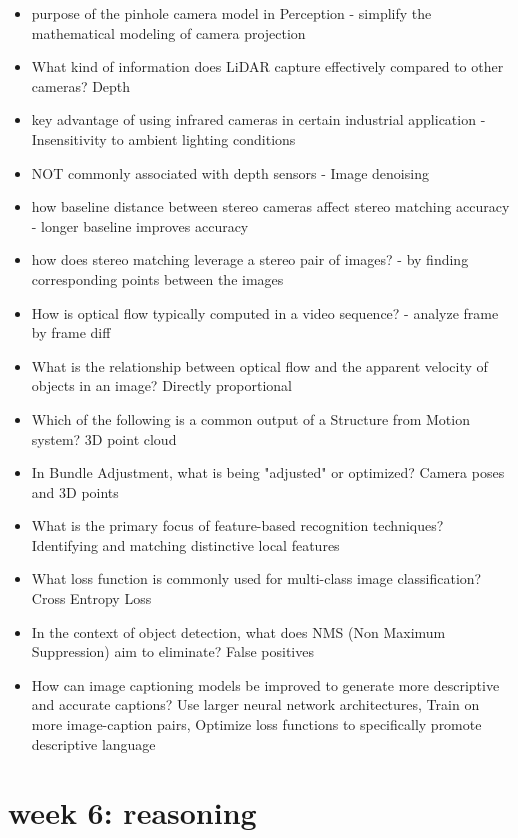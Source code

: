 \documentclass[10pt]{article}
\begin{document}
\begin{itemize}[label=\(\star\), leftmargin=1em, itemsep=-0.3em]
    \item purpose of the pinhole camera model in Perception -  simplify the mathematical modeling of camera projection
    \item What kind of information does LiDAR capture effectively compared to other cameras? Depth
    \item  key advantage of using infrared cameras in certain industrial application -  Insensitivity to ambient lighting conditions
    \item NOT commonly associated with depth sensors - Image denoising
    \item how baseline distance between stereo cameras affect stereo matching accuracy - longer baseline improves accuracy
    \item how does stereo matching leverage a stereo pair of images?  - by finding corresponding points between the images
    \item How is optical flow typically computed in a video sequence? - analyze frame by frame diff
    \item What is the relationship between optical flow and the apparent velocity of objects in an image? Directly proportional
    \item Which of the following is a common output of a Structure from Motion system? 3D point cloud
    \item In Bundle Adjustment, what is being "adjusted" or optimized? Camera poses and 3D points
    \item What is the primary focus of feature-based recognition techniques? Identifying and matching distinctive local features
    \item What loss function is commonly used for multi-class image classification? Cross Entropy Loss
    \item In the context of object detection, what does NMS (Non Maximum Suppression) aim to eliminate? False positives
    \item How can image captioning models be improved to generate more descriptive and accurate captions? Use larger neural network architectures, Train on more image-caption pairs, Optimize loss functions to specifically promote descriptive language
\end{itemize}
\section*{week 6: reasoning}
\end{document}
